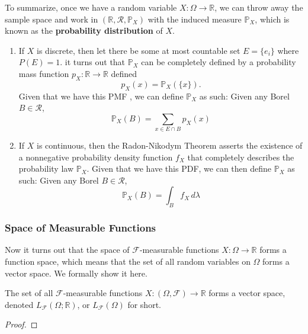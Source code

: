 \documentclass{article}
\begin{document}
      To summarize, once we have a random variable $X: \Omega \rightarrow \mathbb{R}$, we can throw away the sample space and work in $(\mathbb{R}, \mathcal{R}, \mathbb{P}_X)$ with the induced measure $\mathbb{P}_X$, which is known as the \textbf{probability distribution} of $X$.  
      \begin{enumerate}
        \item If $X$ is discrete, then let there be some at most countable set $E = \{e_i\}$ where $P(E) = 1$. it turns out that $\mathbb{P}_X$ can be completely defined by a probability mass function $p_X : \mathbb{R} \rightarrow \mathbb{R}$ defined 
        \begin{equation}
          p_X (x) = \mathbb{P}_X (\{x\}).
        \end{equation}
        Given that we have this PMF , we can define $\mathbb{P}_X$ as such: Given any Borel $B \in \mathcal{R}$, 
        \begin{equation}
          \mathbb{P}_X (B) = \sum_{x \in E \cap B} p_X (x)
        \end{equation}
        \item If $X$ is continuous, then the Radon-Nikodym Theorem asserts the existence of a nonnegative probability density function $f_X$ that completely describes the probability law $\mathbb{P}_X$. Given that we have this PDF, we can then define $\mathbb{P}_X$ as such: Given any Borel $B \in \mathcal{R}$, 
        \begin{equation}
          \mathbb{P}_X (B) = \int_B f_X \, d\lambda
        \end{equation}
      \end{enumerate}

    \subsubsection{Space of Measurable Functions}

      Now it turns out that the space of $\mathcal{F}$-measurable functions $X: \Omega \rightarrow \mathbb{R}$ forms a function space, which means that the set of all random variables on $\Omega$ forms a vector space. We formally show it here. 

      \begin{lemma}
        The set of all $\mathcal{F}$-measurable functions $X: (\Omega, \mathcal{F}) \rightarrow \mathbb{R}$ forms a vector space, denoted $L_\mathcal{F} (\Omega; \mathbb{R})$, or $L_\mathcal{F} (\Omega)$ for short. 
      \end{lemma}
      \begin{proof}

      \end{proof}
\end{document}
